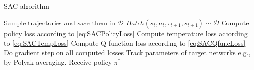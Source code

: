 \documentclass{report}
\numberwithin{equation}{section}
\numberwithin{figure}{section}
\numberwithin{table}{section}
\numberwithin{algorithm}{section}
\begin{document}
\begin{algorithm}
  \caption{SAC algorithm}
  \label{alg:SAC}
  \begin{algorithmic}
        \State Sample trajectories and save them in $\mathcal{D}$
          \State $Batch(s_t, a_t, r_{t+1}, s_{t+1})\sim\mathcal{D}$
          \State Compute policy loss according to \ref{eq:SACPolicyLoss}
          \State Compute temperature loss according to \ref{eq:SACTempLoss}
          \State Compute Q-function loss according to \ref{eq:SACQfuncLoss}
          \State Do gradient step on all computed losses
          \State Track parameters of target networks e.g., by Polyak averaging.
        \EndFor
      \EndFor
    \EndFor
    \State Receive policy $\pi^*$
  \end{algorithmic}
\end{algorithm}




\end{document}
